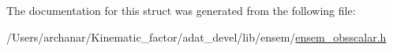 The documentation for this struct was generated from the following file\+:\begin{DoxyCompactItemize}
\item 
/\+Users/archanar/\+Kinematic\+\_\+factor/adat\+\_\+devel/lib/ensem/\mbox{\hyperlink{lib_2ensem_2ensem__obsscalar_8h}{ensem\+\_\+obsscalar.\+h}}\end{DoxyCompactItemize}

